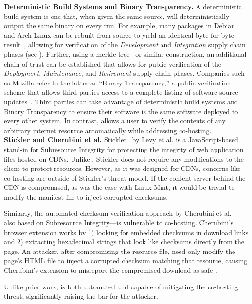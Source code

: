 \noindent\textbf{Deterministic Build Systems and Binary Transparency.} A
deterministic build system is one that, when given the same source, will
deterministically output the same binary on every run. For example, many
packages in Debian~\cite{ReproBuildsDebian} and Arch Linux can be rebuilt from
source to yield an identical byte for byte result~\cite{ReproBuilds}, allowing
for verification of the \emph{Development} and \emph{Integration} supply chain
phases (see ). Further, using a merkle tree~\cite{MerkleTree} or
similar construction, an additional chain of trust can be established that
allows for public verification of the \emph{Deployment}, \emph{Maintenance}, and
\emph{Retirement} supply chain phases. Companies such as Mozilla refer to the
latter as ``Binary Transparency,'' a public verification scheme that allows
third parties access to a complete listing of software source
updates~\cite{BinaryTransparency}. Third parties can take advantage of
deterministic build systems and Binary Transparency to ensure their software is
the same software deployed to every other system. In contrast, \SYSTEM{} allows
a user to verify the contents of any arbitrary internet resource automatically
while addressing co-hosting. \\

\noindent\textbf{Stickler and Cherubini et al.} Stickler~\cite{Stickler} by Levy
et al. is a JavaScript-based stand-in for Subresource Integrity for protecting
the integrity of web application files hosted on CDNs. Unlike \SYSTEM{},
Stickler does not require any modifications to the client to protect resources.
However, as it was designed for CDNs, concerns like co-hosting are outside of
Stickler's threat model. If the content server behind the CDN is compromised, as
was the case with Linux Mint, it would be trivial to modify the manifest file to
inject corrupted checksums.

Similarly, the automated checksum verification approach by Cherubini et
al.~\cite{Cherubini}---also based on Subresource Integrity---is vulnerable to
co-hosting. Cherubini's browser extension works by 1) looking for embedded
checksums in download links and 2) extracting hexadecimal strings that look like
checksums directly from the page. An attacker, after compromising the resource
file, need only modify the page's HTML file to inject a corrupted checksum
matching that resource, causing Cherubini's extension to misreport the
compromised download as safe~\cite{Cherubini}.

Unlike prior work, \SYSTEM{} is both automated and capable of mitigating the
co-hosting threat, significantly raising the bar for the attacker.

